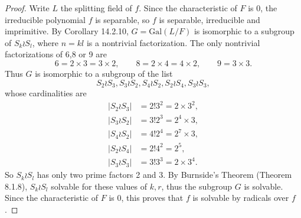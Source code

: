 \documentclass[11pt,a4paper]{article}
\newcommand{\Gal}{\mathrm{Gal}}
\begin{document}
\begin{proof}
Write $L$ the splitting field of $f$. Since the characteristic of $F$ is 0, the irreducible polynomial $f$ is separable, so $f$ is separable, irreducible and imprimitive.  By Corollary 14.2.10, $G = \Gal(L/F)$ is isomorphic to a subgroup of $S_k \wr S_l$, where $n = kl$ is a nontrivial factorization. The only nontrivial factorizations of 6,8 or 9 are
$$6 = 2 \times 3 = 3 \times 2, \qquad 8 = 2 \times 4 = 4 \times 2, \qquad 9 = 3 \times 3.$$
Thus $G$ is isomorphic to a subgroup of the list
$$S_2 \wr S_3, S_3\wr S_2,S_4 \wr S_2,S_2 \wr S_4, S_3\wr S_3,$$
whose cardinalities are
\begin{align*}
|S_2 \wr S_3| &= 2!3^2 = 2 \times 3^2,\\
 |S_3\wr S_2| &= 3!2^3 = 2^4 \times 3,\\
 |S_4 \wr S_2| &= 4!2^4 = 2^7 \times 3,\\
 |S_2 \wr S_4| &= 2!4^2 = 2^5,\\
 |S_3\wr S_3| &=3!3^3 = 2 \times 3^4. 
\end{align*}
So $S_k \wr S_l$ has only two prime factors 2 and 3. By Burnside's Theorem (Theorem 8.1.8), $S_k \wr S_l$ solvable for these values of $k,r$, thus the subgroup $G$ is solvable. Since the characteristic of $F$ is 0, this proves that $f$ is solvable by radicals over $f$.
\end{proof}
\end{document}
